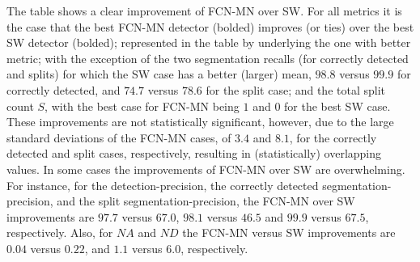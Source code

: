 \documentclass[a4paper,authoryear,review]{elsarticle}
\begin{document}
	
	The table shows a clear improvement of FCN-MN over SW. For all metrics it is the case that the best  FCN-MN detector (bolded) improves (or ties) over the best SW detector (bolded); represented in the table by underlying the one with better metric; with the exception of the two segmentation recalls (for correctly detected and splits) for which the SW case has a better (larger) mean, $98.8$ versus $99.9$ for correctly detected, and $74.7$ versus $78.6$ for the split case; and the total split count $S$, with the best case for FCN-MN being $1$ and $0$ for the best SW case. These improvements are not statistically significant, however, due to the large standard deviations of the FCN-MN cases, of $3.4$ and $8.1$, for the correctly detected and split cases, respectively,  resulting in (statistically) overlapping values. 
	In some cases the improvements of FCN-MN over SW are overwhelming. For instance, for the detection-precision, the correctly detected segmentation-precision, and the split segmentation-precision, the FCN-MN over SW improvements are $97.7$ versus $67.0$, $98.1$ versus $46.5$ and $99.9$ versus $67.5$, respectively.  Also, for $NA$ and $ND$ the  FCN-MN versus SW improvements are $0.04$ versus $0.22$, and $1.1$ versus $6.0$, respectively.
	
	
	
	
	
\end{document}
